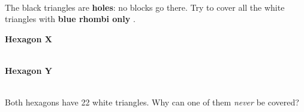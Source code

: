 \vspace{0.2in}
\noindent
\begin{minipage}[t]{3.5in}
\hspace{0.15in}\\[10pt]
\possimp\\[6pt]\updn

\vspace{0.22in}
\hspace{0.15in}\\[10pt]
\possimp\\[6pt]\updn

\vspace{0.22in}
\hspace{0.15in}\\[10pt]
\possimp\\[6pt]\updn
\end{minipage}\hfill
\begin{minipage}[t]{3.6in}
\hspace{0.15in}\\[10pt]
\possimp\\[6pt]\updn

\vspace{0.4in}
\end{minipage}
\actualsize
\newpage

The black triangles are \textbf{holes}: no blocks go there. Try to cover all the white
triangles with \textbf{blue rhombi only} .

\vspace{0.12in}
\noindent
\begin{minipage}[c]{4.15in}\end{minipage}\hfill
\begin{minipage}[c]{3.1in}
\; \textbf{Hexagon X}\\[12pt]
\possimp\\[14pt]
\updn
\end{minipage}

\vspace{0.15in}
\noindent
\begin{minipage}[c]{4.15in}\end{minipage}\hfill
\begin{minipage}[c]{3.1in}
\; \textbf{Hexagon Y}\\[12pt]
\possimp\\[14pt]
\updn

\vspace{0.3in}
Both hexagons have 22 white triangles. Why can one of them \emph{never} be covered?
\end{minipage}

